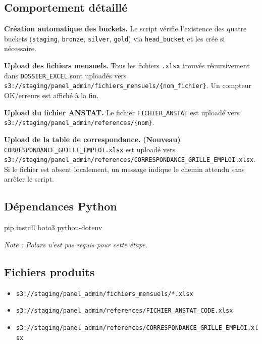 \documentclass[12pt,a4paper,french]{report}
\newcommand{\bucket}[1]{\texttt{s3://#1}}
\begin{document}
\subsection{Comportement détaillé}

\textbf{Création automatique des buckets.} Le script vérifie l'existence des
quatre buckets (\texttt{staging}, \texttt{bronze}, \texttt{silver},
\texttt{gold}) via \texttt{head\_bucket} et les crée si nécessaire.

\textbf{Upload des fichiers mensuels.} Tous les fichiers \texttt{.xlsx}
trouvés récursivement dans \texttt{DOSSIER\_EXCEL} sont uploadés vers
\bucket{staging/panel\_admin/fichiers\_mensuels/\{nom\_fichier\}}.
Un compteur OK/erreurs est affiché à la fin.

\textbf{Upload du fichier ANSTAT.} Le fichier \texttt{FICHIER\_ANSTAT} est
uploadé vers \bucket{staging/panel\_admin/references/\{nom\}}.

\textbf{Upload de la table de correspondance.} \textbf{(Nouveau)}
\texttt{CORRESPONDANCE\_GRILLE\_EMPLOI.xlsx} est uploadé vers
\bucket{staging/panel\_admin/references/CORRESPONDANCE\_GRILLE\_EMPLOI.xlsx}.
Si le fichier est absent localement, un message indique le chemin attendu
sans arrêter le script.

\subsection{Dépendances Python}

\begin{codebox}[]
pip install boto3 python-dotenv
\end{codebox}

\textit{Note : Polars n'est pas requis pour cette étape.}

\subsection{Fichiers produits}

\begin{itemize}[nosep]
  \item \bucket{staging/panel\_admin/fichiers\_mensuels/*.xlsx}
  \item \bucket{staging/panel\_admin/references/FICHIER\_ANSTAT\_CODE.xlsx}
  \item \bucket{staging/panel\_admin/references/CORRESPONDANCE\_GRILLE\_EMPLOI.xlsx}
\end{itemize}

\end{document}
